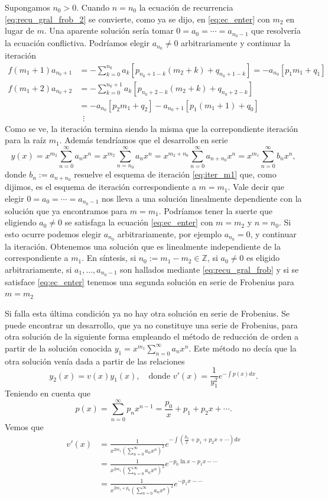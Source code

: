 \documentclass{article}
\newcounter{cor_cont}
\newcounter{ejem_cont}
\renewcommand{\emph}[1]{\textcolor[rgb]{0,0,1}{#1}}
\begin{document}
Supongamos $n_0>0$.  Cuando $n=n_0$ la ecuación de recurrencia  \eqref{eq:recu_gral_frob_2} se convierte, como ya se dijo, en \eqref{eq:ec_enter} con $m_2$ en lugar de $m$.\label{pag:apar_sol} Una aparente solución sería tomar  $0=a_0=\cdots=a_{n_0-1}$ que resolvería la ecuación conflictiva. Podríamos elegir $a_{n_0}\neq 0$ arbitrariamente y continuar la iteración
\begin{equation}\label{eq:iter_m1}
  \begin{split}
    f(m_1+1)a_{n_0+1}&=-\sum_{k=0}^{n_0}a_k\left[p_{n_0+1-k}(m_2+k) + q_{n_0+1-k}\right]=-a_{n_0}[p_1m_1+q_1]\\
   f(m_1+2) a_{n_0+2}&=-\sum_{k=0}^{n_0+1}a_k\left[p_{n_0+2-k}(m_2+k) + q_{n_0+2-k}\right]\\
                   &=-a_{n_0}[p_2m_1+q_2]-a_{n_0+1}[p_1(m_1+1)+q_0]\\
                   &\,\,\,\vdots
  \end{split}
\end{equation}
Como se ve, la iteración termina siendo la misma que la correpondiente iteración para la raíz $m_1$. Además tendríamos que el desarrollo en serie
\[y(x)=x^{m_2}\sum_{n=0}^{\infty}a_nx^n=x^{m_2}\sum_{n=n_0}^{\infty}a_nx^n
 =x^{m_2+n_0}\sum_{n=0}^{\infty}a_{n+n_0}x^n
=x^{m_1}\sum_{n=0}^{\infty}b_nx^n
,\]
donde $b_n:=a_{n+n_0}$ resuelve el esquema de iteración \eqref{eq:iter_m1} que, como dijimos, es el esquema de iteración correspondiente a $m=m_1$. Vale decir que elegir  $0=a_0=\cdots=a_{n_0-1}$ nos lleva a una solución linealmente dependiente con la solución que ya encontramos para $m=m_1$. Podríamos tener la suerte que eligiendo $a_0\neq 0$ se satisfaga la ecuación \eqref{eq:ec_enter} con $m=m_2$ y $n=n_0$. Si esto ocurre podemos elegir $a_{n_0}$ arbitrariamente, por ejemplo $a_{n_0}=0$, y continuar la iteración. Obtenemos una solución que es linealmente independiente   de la correspondiente a $m_1$. En síntesis, \emph{si $n_0:=m_1-m_2\in\mathbb{Z}$, si $a_0\neq 0$ es eligido arbitrariamente, si  $a_1,\ldots,a_{n_0-1}$ son hallados mediante \eqref{eq:recu_gral_frob} y si se satisface  \eqref{eq:ec_enter} tenemos una segunda solución en serie de Frobenius para $m=m_2$}

Si falla esta última condición ya no hay otra solución en serie de Frobenius. Se puede encontrar un desarrollo, que ya no constituye una serie de Frobenius,  para otra solución de la siguiente forma empleando el método de reducción de orden a partir de la solución conocida $y_1=x^{m_1}\sum_{n=0}^{\infty}a_nx^n$. Este método no decía que la otra solución venía dada a partir de las relaciones
\[y_2(x)=v(x)y_1(x),\quad\text{donde  } v'(x)=\frac{1}{y_1^2}e^{-\int p(x)dx}.\]  
Teniendo en cuenta que
\[p(x)=\sum_{n=0}^{\infty}p_nx^{n-1}=\frac{p_0}{x}+p_1+p_2x+\cdots.\]
Vemos que
\[
   \begin{split}
     v'(x)&=\frac{1}{x^{2m_1}\left(\sum_{n=0}^{\infty}a_nx^n\right)^2}e^{-\int \left(\frac{p_0}{x}+p_1+p_2x+\cdots \right)dx}\\
  &= \frac{1}{x^{2m_1}\left(\sum_{n=0}^{\infty}a_nx^n\right)^2}e^{-p_0 \ln x -p_1x-\cdots }\\
  &= \frac{1}{x^{2m_1+p_0}\left(\sum_{n=0}^{\infty}a_nx^n\right)^2}e^{ -p_1x-\cdots }
   \end{split}
\]
\end{document}
